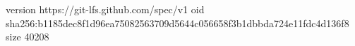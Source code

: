 version https://git-lfs.github.com/spec/v1
oid sha256:b1185dec8f1d96ea75082563709d5644c056658f3b1dbbda724e11fdc4d136f8
size 40208
